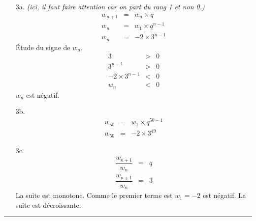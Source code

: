 \documentclass[11pt]{article}
\newcommand{\horrule}[1]{\rule{\linewidth}{#1}} %
\begin{document}
\begin{multicols}{2}
  
  \begin{enumerate}
  \item[3a.] \textit{ (ici, il faut faire attention car on part du rang 1 et non 0.)}
    \begin{eqnarray*}
      w_{n+1} &=& w_n \times q \\
      w_n &=& w_1 \times q^{n-1} \\
      w_n &=& -2 \times 3^{n-1}
    \end{eqnarray*}
    Étude du signe de $w_n$.
    \begin{eqnarray*}
      3 &>& 0 \\
      3^{n-1} &>& 0 \\
      -2 \times 3^{n-1} &<& 0 \\
      w_n &<& 0 
    \end{eqnarray*}
    $w_n$ est négatif.
    
  \item[3b.] 
    \begin{eqnarray*}
      w_{50} &=& w_1 \times q^{50-1} \\
      w_{50} &=& -2 \times 3^{49}
    \end{eqnarray*}
    
  \item[3c.] 
    \begin{eqnarray*}
      \dfrac{w_{n+1}}{w_n} &=& q \\
      \dfrac{w_{n+1}}{w_n} &=& 3
    \end{eqnarray*}
    La suite est monotone. 
    Comme le premier terme est $w_1 = -2$ est négatif. La suite est décroissante.
  \end{enumerate}
\end{multicols}
\horrule{1px}
\end{document}
